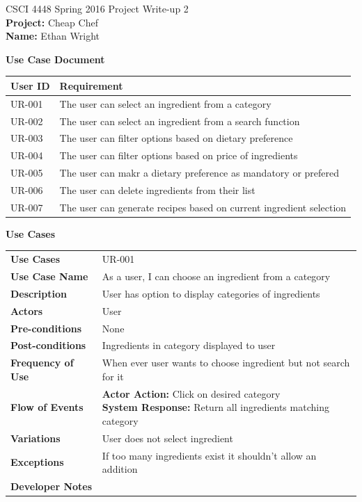 \documentclass[12pt]{article}
\begin{document}
CSCI 4448 Spring 2016 \hfill Project Write-up 2\\
\textbf{Project: } Cheap Chef \\
\textbf{Name: } Ethan Wright \\


\hrulefill
\begin{center}
  \textbf{Use Case Document}
  \begin{tabular}{l  l}
    \textbf{User ID} & \textbf{Requirement} \\ \hline \rowcolor[gray]{.95}
    UR-001 & The user can select an ingredient from a category \\
    UR-002 & The user can select an ingredient from a search function \\ \rowcolor[gray]{.95}
    UR-003 & The user can filter options based on dietary preference \\ 
    UR-004 & The user can filter options based on price of ingredients \\ \rowcolor[gray]{.95}
    UR-005 & The user can makr a dietary preference as mandatory or prefered \\
    UR-006 & The user can delete ingredients from their list \\ \rowcolor[gray]{.95}
    UR-007 & The user can generate recipes based on current ingredient selection \\ 
  \end{tabular}
\end{center}
\newpage
\begin{center}
  \textbf{Use Cases}
\end{center}
  \begin{tabular}{ l | l }
    \hline
    \textbf{Use Cases} & UR-001 \\ \rowcolor[gray]{.95}
    \textbf{Use Case Name} & As a user, I can choose an ingredient from a category \\ 
    \textbf{Description} & User has option to display categories of ingredients \\ \rowcolor[gray]{.95}
    \textbf{Actors} & User \\
    \textbf{Pre-conditions} & None \\ \rowcolor[gray]{.95}
    \textbf{Post-conditions} & Ingredients in category displayed to user \\ 
    \textbf{Frequency of Use} & When ever user wants to choose ingredient but not search for it \\ \rowcolor[gray]{.95}
    \textbf{Flow of Events} & \pbox{20cm}{\textbf{Actor Action: } Click on desired category\\ \textbf{System Response:} Return
    all ingredients matching category} \\ 
    \textbf{Variations} & User does not select ingredient \\  \rowcolor[gray]{.95}
    \textbf{Exceptions} & If too many ingredients exist it shouldn't allow an addition \\
    \textbf{Developer Notes} &  \\ \hline
  \end{tabular}
\end{document}
